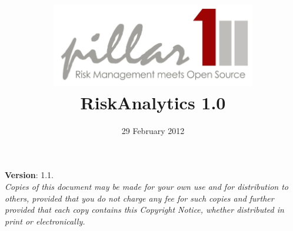 

\begin{titlepage}
%
\title{\includegraphics[width=9cm]{images/pillarone-logo-simple-small.jpg}\\[2cm]
%
{\Huge \textsf{RiskAnalytics 1.0}}\\[1cm]}
\author{}%
\date{29 February 2012}%
\maketitle

\begin{flushleft}
{\small{
{\bfseries Version}: 1.1.\pageref{LastPage}\\[1cm]

\emph{Copies of this document may be made for your own use and for distribution to others, provided that you do not charge any fee for such copies and further provided that each copy contains this Copyright Notice, whether distributed in print or electronically.}\\[1cm]

}}
\end{flushleft}
\end{titlepage}
